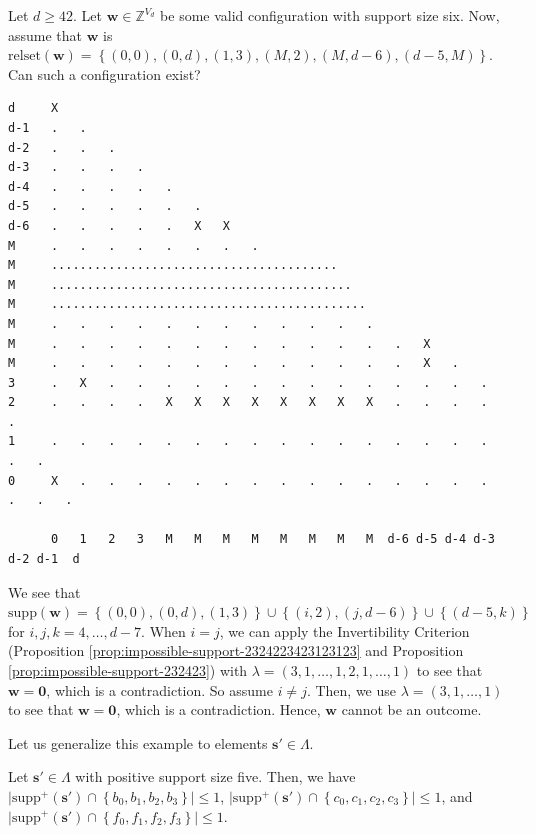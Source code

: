 \begin{example}\label{ex:siuh438h89}
    Let \( d \geq 42 \). Let \( \mathbf{w} \in \mathbb{Z}^{V_d} \) be some valid configuration with support size six. Now, assume that \( \mathbf{w} \) is \( \mathrm{relset}(\mathbf{w}) = \left\{ (0,0), (0,d), (1,3), (M,2), (M, d-6), (d-5, M) \right\} \). Can such a configuration exist?
    \begin{small}
    \begin{verbatim}
d     X
d-1   .   .
d-2   .   .   .
d-3   .   .   .   .
d-4   .   .   .   .   .
d-5   .   .   .   .   .   .
d-6   .   .   .   .   .   X   X
M     .   .   .   .   .   .   .   .
M     ........................................
M     ..........................................
M     ............................................
M     .   .   .   .   .   .   .   .   .   .   .   .   
M     .   .   .   .   .   .   .   .   .   .   .   .   .   X
M     .   .   .   .   .   .   .   .   .   .   .   .   .   X   .   
3     .   X   .   .   .   .   .   .   .   .   .   .   .   .   .   .
2     .   .   .   .   X   X   X   X   X   X   X   X   .   .   .   .   .     
1     .   .   .   .   .   .   .   .   .   .   .   .   .   .   .   .   .   .
0     X   .   .   .   .   .   .   .   .   .   .   .   .   .   .   .   .   .   .

      0   1   2   3   M   M   M   M   M   M   M   M  d-6 d-5 d-4 d-3 d-2 d-1  d
    \end{verbatim}
    \end{small}

    We see that \( \mathrm{supp}(\mathbf{w}) = \left\{ (0,0), (0,d), (1,3) \right\} \cup \left\{ (i,2), (j,d-6 ) \right\} \cup \left\{ (d-5,k ) \right\} \)
    for \( i,j,k  = 4, \dots, d-7 \). When \( i = j \), we can apply the Invertibility Criterion (Proposition \ref{prop:impossible-support-2324223423123123} and Proposition \ref{prop:impossible-support-232423}) with \( \lambda = (3,1, \dots,1, 2, 1, \dots, 1) \) to see that \( \mathbf{w} = \mathbf{0} \), which is a contradiction. So assume \( i \neq j \). Then, we use \( \lambda = (3, 1, \dots, 1) \) to see that \( \mathbf{w} = \mathbf{0} \), which is a contradiction. Hence, \( \mathbf{w} \) cannot be an outcome.
\end{example}

Let us generalize this example to elements \(  \mathbf{s}' \in \Lambda \).

\begin{proposition}
    Let \( \mathbf{s}' \in \Lambda \) with positive support size five. Then, we have \( \lvert \mathrm{supp}^+(\mathbf{s}') \cap \left\{ b_0,b_1,b_2,b_3 \right\} \rvert \leq 1 \), \( \lvert \mathrm{supp}^+(\mathbf{s}') \cap \left\{ c_0,c_1,c_2,c_3 \right\} \rvert \leq 1 \), and \( \lvert \mathrm{supp}^+(\mathbf{s}') \cap \left\{ f_0,f_1,f_2,f_3 \right\} \rvert \leq 1 \).
\end{proposition}


